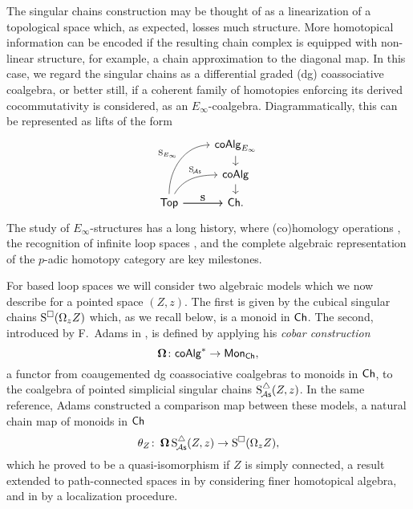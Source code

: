The singular chains construction may be thought of as a linearization of a topological space which, as expected, losses much structure.
More homotopical information can be encoded if the resulting chain complex is equipped with non-linear structure, for example, a chain approximation to the diagonal map.
In this case, we regard the singular chains as a differential graded (dg) coassociative coalgebra, or better still, if a coherent family of homotopies enforcing its derived cocommutativity is considered, as an $E_\infty$-coalgebra.
Diagrammatically, this can be represented as lifts of the form
\begin{equation}
\begin{tikzcd}[column sep=normal, row sep=small]
& \coAlg_{E_\infty} \arrow[d] \\
& \coAlg \arrow[d] \\
\Top \arrow[uur, "\Schains_{E_\infty}", out=90, in=180] \arrow[r, "\Schains"]
\arrow[ur, "\SchainsA", out=60, in=180, near end]
\arrow[r, "\Schains"]
& \Ch.
\end{tikzcd}
\end{equation}
The study of $E_\infty$-structures has a long history, where (co)homology operations \cite{steenrod1962cohomology, may1970general}, the recognition of infinite loop spaces \cite{boardman1973homotopy, may1972geometry}, and the complete algebraic representation of the $p$-adic homotopy category \cite{mandell2001padic} are key milestones.

For based loop spaces we will consider two algebraic models which we now describe for a pointed space $(Z, z)$.
The first is given by the cubical singular chains $\operatorname{S^{\square}}(\Omega_z Z)$ which, as we recall below, is a monoid in $\mathsf{Ch}$.
The second, introduced by F.~Adams in \cite{adams1956cobar}, is defined by applying his \textit{cobar construction}
\[
\operatorname{\mathbf{\Omega}} \colon \mathsf{coAlg}^\ast \to \mathsf{Mon}_{\mathsf{Ch}},
\]
a functor from coaugemented dg coassociative coalgebras to monoids in $\mathsf{Ch}$, to the coalgebra of pointed simplicial singular chains $\operatorname{S^{\triangle}_{\!{\mathcal{A}\mathsf{s}}}}(Z,z)$.
In the same reference, Adams constructed a comparison map between these models, a natural chain map of monoids in $\mathsf{Ch}$
\begin{equation} \label{e:adams map}
\theta_Z \colon \operatorname{\mathbf{\Omega}} \operatorname{S^{\triangle}_{\!{\mathcal{A}\mathsf{s}}}}(Z,z) \to \operatorname{S^{\square}}(\Omega_z Z),
\end{equation}
which he proved to be a quasi-isomorphism if $Z$ is simply connected, a result extended to path-connected spaces in \cite{rivera2018cubical} by considering finer homotopical algebra, and in \cite{hess2010cobar} by a localization procedure.

